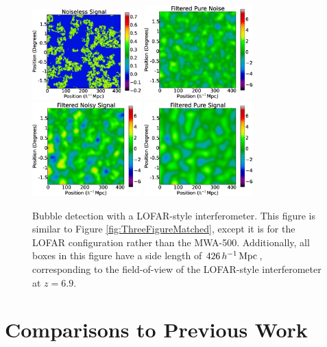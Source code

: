 \begin{figure}[h]
  \centering
  \includegraphics[width=4.2cm]{f12a.eps}
  \includegraphics[width=4.2cm]{f12b.eps}
  \includegraphics[width=4.2cm]{f12c.eps}
  \includegraphics[width=4.2cm]{f12d.eps}
  \caption{Bubble detection with a LOFAR-style interferometer. This figure is similar to Figure \ref{fig:ThreeFigureMatched}, except it is for the LOFAR configuration rather than the MWA-500. Additionally, all boxes in this figure have 
a side length of $426\,h^{-1}\,{\rm Mpc}\,$, corresponding to the field-of-view of the LOFAR-style
interferometer at $z = 6.9$.}
  \label{fig:ThreePanelLOFAR}
\end{figure}


\section{Comparisons to Previous Work} \label{sec:BubblePreviousWork}

